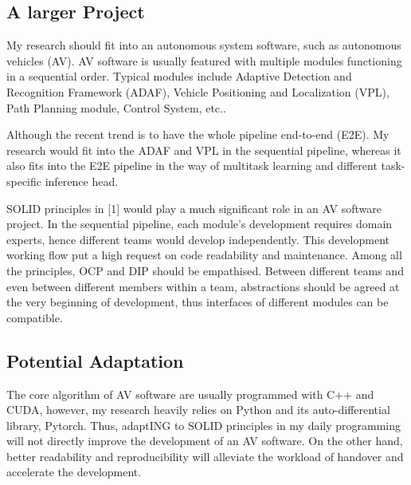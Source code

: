 \documentclass{article}
\begin{document}
\subsection{A larger Project}
My research should fit into an autonomous system software, such as autonomous vehicles (AV). 
AV software is usually featured with multiple modules functioning in a sequential order. 
Typical modules include Adaptive Detection and Recognition Framework (ADAF), Vehicle Positioning and Localization (VPL), Path Planning module, Control System, etc..

Although the recent trend is to have the whole pipeline end-to-end (E2E). 
My research would fit into the ADAF and VPL in the sequential pipeline, whereas it also fits into the E2E pipeline in the way of multitask learning and different task-specific inference head. 

SOLID principles in [1] would play a much significant role in an AV software project. 
In the sequential pipeline, each module's development requires domain experts, hence different teams would develop independently. 
This development working flow put a high request on code readability and maintenance.
Among all the principles, OCP and DIP should be empathised. 
Between different teams and even between different members within a team,
abstractions should be agreed at the very beginning of development, thus interfaces of different modules can be compatible. 



\subsection{Potential Adaptation}
The core algorithm of AV software are usually programmed with C++ and CUDA, however, my research heavily relies on Python and its auto-differential library, Pytorch.
Thus, adaptING to SOLID principles in my daily programming will not directly improve the development of an AV software.
On the other hand, better readability and reproducibility will alleviate the workload of handover and accelerate the development.
\end{document}
